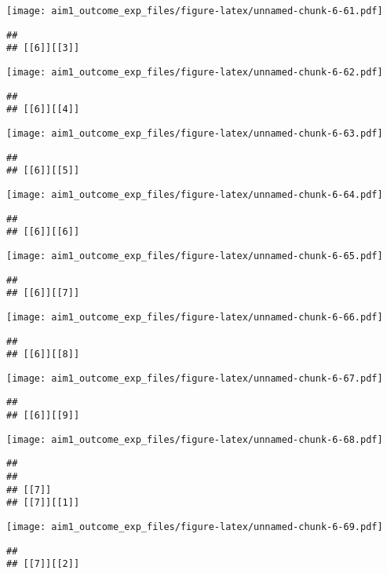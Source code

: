 \documentclass[
]{article}
\begin{document}
\texttt{[image: aim1\_outcome\_exp\_files/figure-latex/unnamed-chunk-6-61.pdf]}

\begin{verbatim}
## 
## [[6]][[3]]
\end{verbatim}

\texttt{[image: aim1\_outcome\_exp\_files/figure-latex/unnamed-chunk-6-62.pdf]}

\begin{verbatim}
## 
## [[6]][[4]]
\end{verbatim}

\texttt{[image: aim1\_outcome\_exp\_files/figure-latex/unnamed-chunk-6-63.pdf]}

\begin{verbatim}
## 
## [[6]][[5]]
\end{verbatim}

\texttt{[image: aim1\_outcome\_exp\_files/figure-latex/unnamed-chunk-6-64.pdf]}

\begin{verbatim}
## 
## [[6]][[6]]
\end{verbatim}

\texttt{[image: aim1\_outcome\_exp\_files/figure-latex/unnamed-chunk-6-65.pdf]}

\begin{verbatim}
## 
## [[6]][[7]]
\end{verbatim}

\texttt{[image: aim1\_outcome\_exp\_files/figure-latex/unnamed-chunk-6-66.pdf]}

\begin{verbatim}
## 
## [[6]][[8]]
\end{verbatim}

\texttt{[image: aim1\_outcome\_exp\_files/figure-latex/unnamed-chunk-6-67.pdf]}

\begin{verbatim}
## 
## [[6]][[9]]
\end{verbatim}

\texttt{[image: aim1\_outcome\_exp\_files/figure-latex/unnamed-chunk-6-68.pdf]}

\begin{verbatim}
## 
## 
## [[7]]
## [[7]][[1]]
\end{verbatim}

\texttt{[image: aim1\_outcome\_exp\_files/figure-latex/unnamed-chunk-6-69.pdf]}

\begin{verbatim}
## 
## [[7]][[2]]
\end{verbatim}
\end{document}
